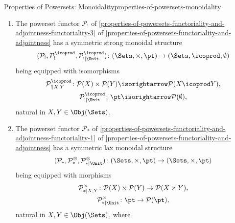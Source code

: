 \begin{proposition}{Properties of Powersets: Monoidality}{properties-of-powersets-monoidality}
\begin{enumerate}
\[\begin{gathered}
                \end{gathered}
            \]%
            natural in $X,Y\in\Obj(\Sets)$.
        \item\label{properties-of-powersets-monoidality-symmetric-strong-monoidality-with-respect-to-coproducts-3}The powerset functor $\mathcal{P}_{!}$ of \cref{properties-of-powersets-functoriality-and-adjointness-functoriality-3} of \cref{properties-of-powersets-functoriality-and-adjointness} has a symmetric strong monoidal structure
            \[
                (\mathcal{P}_{!},\mathcal{P}^{\icoprod}_{!},\mathcal{P}^{\icoprod}_{!|\Unit})
                \colon
                (\Sets,\times,\pt)
                \to
                (\Sets,\icoprod,\emptyset)
            \]%
            being equipped with isomorphisms%
            \[
                \begin{gathered}
                    \mathcal{P}^{\icoprod}_{!|X,Y}   \colon \mathcal{P}(X)\times\mathcal{P}(Y) \isorightarrow    \mathcal{P}(X\icoprod Y),\\
                    \mathcal{P}^{\icoprod}_{!|\Unit} \colon \pt                                \isorightarrow    \mathcal{P}(\emptyset),
                \end{gathered}
            \]%
            natural in $X,Y\in\Obj(\Sets)$.
        \item\label{properties-of-powersets-monoidality-symmetric-lax-monoidality-with-respect-to-products-1}The powerset functor $\mathcal{P}_{*}$ of \cref{properties-of-powersets-functoriality-and-adjointness-functoriality-1} of \cref{properties-of-powersets-functoriality-and-adjointness} has a symmetric lax monoidal structure
            \[
                (\mathcal{P}_{*},\mathcal{P}^{\otimes}_{*},\mathcal{P}^{\otimes}_{*|\Unit})
                \colon
                (\Sets,\times,\pt)
                \to
                (\Sets,\times,\pt)
            \]%
            being equipped with morphisms%
            \[
                \begin{gathered}
                    \mathcal{P}^{\times}_{*|X,Y}   \colon \mathcal{P}(X)\times\mathcal{P}(Y) \to \mathcal{P}(X\times Y),\\
                    \mathcal{P}^{\times}_{*|\Unit} \colon \pt                                \to \mathcal{P}(\pt),
                \end{gathered}
            \]%
            natural in $X,Y\in\Obj(\Sets)$, where

\end{enumerate}
\end{proposition}
